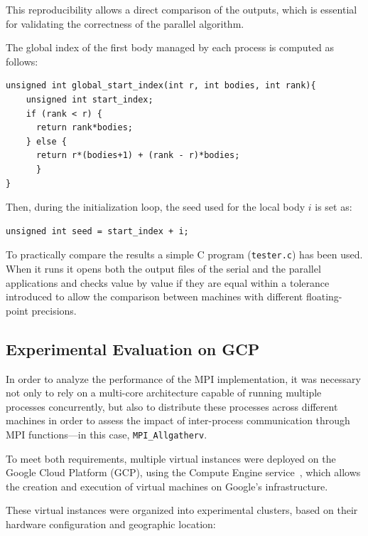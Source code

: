 \documentclass{article}
\begin{document}
This reproducibility allows a direct comparison of the outputs, which is essential for validating the correctness of the parallel algorithm.

The global index of the first body managed by each process is computed as follows:
\begin{lstlisting}
unsigned int global_start_index(int r, int bodies, int rank){
    unsigned int start_index;
    if (rank < r) {
      return rank*bodies;
    } else {
      return r*(bodies+1) + (rank - r)*bodies;
      }
}
\end{lstlisting}
Then, during the initialization loop, the seed used for the local body $i$ is set as:
\begin{lstlisting}
unsigned int seed = start_index + i;
\end{lstlisting}

To practically compare the results a simple C program (\texttt{tester.c}) has been used.
When it runs it opens both the output files of the serial and the parallel applications and checks value by value if they are equal within a tolerance introduced to allow the comparison between machines with different floating-point precisions.

\subsection{Experimental Evaluation on GCP}
In order to analyze the performance of the MPI implementation, it was necessary not only to rely on a multi-core architecture capable of running multiple processes concurrently, but also to distribute these processes across different machines in order to assess the impact of inter-process communication through MPI functions—in this case, \texttt{MPI\_Allgatherv}.  

To meet both requirements, multiple virtual instances were deployed on the Google Cloud Platform (GCP), using the Compute Engine service~\cite{gcp_compute}, which allows the creation and execution of virtual machines on Google’s infrastructure.

These virtual instances were organized into experimental clusters, based on their hardware configuration and geographic location:
\end{document}

